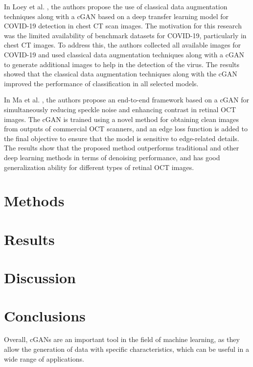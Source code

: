 \documentclass[conference]{IEEEtran}
\begin{document}
In Loey et al. \cite{Loey2020AImages}, the authors propose the use of classical data augmentation techniques along with a cGAN based on a deep transfer learning model for COVID-19 detection in chest CT scan images. The motivation for this research was the limited availability of benchmark datasets for COVID-19, particularly in chest CT images. To address this, the authors collected all available images for COVID-19 and used classical data augmentation techniques along with a cGAN to generate additional images to help in the detection of the virus. The results showed that the classical data augmentation techniques along with the cGAN improved the performance of classification in all selected models.

In Ma et al. \cite{Ma2018SpeckleCGAN}, the authors propose an end-to-end framework based on a cGAN for simultaneously reducing speckle noise and enhancing contrast in retinal OCT images. The cGAN is trained using a novel method for obtaining clean images from outputs of commercial OCT scanners, and an edge loss function is added to the final objective to ensure that the model is sensitive to edge-related details. The results show that the proposed method outperforms traditional and other deep learning methods in terms of denoising performance, and has good generalization ability for different types of retinal OCT images.

\section{Methods}

\section{Results}

\section{Discussion}

\section{Conclusions}
Overall, cGANs are an important tool in the field of machine learning, as they allow the generation of data with specific characteristics, which can be useful in a wide range of applications.



\end{document}
